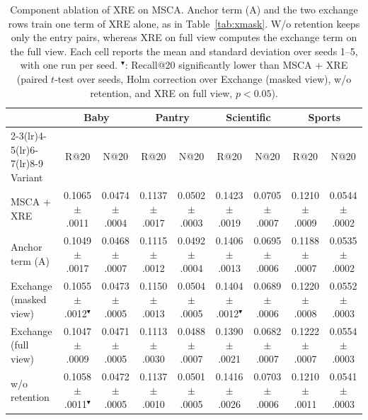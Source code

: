 \begin{table}[!t]
\caption{Component ablation of XRE on MSCA. Anchor term (A) and the two exchange rows train one term of XRE alone, as in Table~\ref{tab:xmask}. W/o retention keeps only the entry pairs, whereas XRE on full view computes the exchange term on the full view. Each cell reports the mean and standard deviation over seeds 1--5, with one run per seed. $^{\blacktriangledown}$: Recall@20 significantly lower than MSCA + XRE (paired $t$-test over seeds, Holm correction over Exchange (masked view), w/o retention, and XRE on full view, $p<0.05$).}
\label{tab:ablation_full}
\centering
\scriptsize
\setlength{\tabcolsep}{2pt}
\begin{tabular}{lcccccccc}
\toprule
 & \multicolumn{2}{c}{Baby} & \multicolumn{2}{c}{Pantry} & \multicolumn{2}{c}{Scientific} & \multicolumn{2}{c}{Sports} \\
\cmidrule(lr){2-3}\cmidrule(lr){4-5}\cmidrule(lr){6-7}\cmidrule(lr){8-9}
Variant & R@20 & N@20 & R@20 & N@20 & R@20 & N@20 & R@20 & N@20 \\
\midrule
MSCA + XRE & 0.1065{\tiny$\pm$.0011} & 0.0474{\tiny$\pm$.0004} & 0.1137{\tiny$\pm$.0017} & 0.0502{\tiny$\pm$.0003} & 0.1423{\tiny$\pm$.0019} & 0.0705{\tiny$\pm$.0007} & 0.1210{\tiny$\pm$.0009} & 0.0544{\tiny$\pm$.0002} \\
Anchor term (A) & 0.1049{\tiny$\pm$.0017} & 0.0468{\tiny$\pm$.0007} & 0.1115{\tiny$\pm$.0012} & 0.0492{\tiny$\pm$.0004} & 0.1406{\tiny$\pm$.0013} & 0.0695{\tiny$\pm$.0006} & 0.1188{\tiny$\pm$.0007} & 0.0535{\tiny$\pm$.0002} \\
Exchange (masked view) & 0.1055{\tiny$\pm$.0012}$^{\blacktriangledown}$ & 0.0473{\tiny$\pm$.0005} & 0.1150{\tiny$\pm$.0013} & 0.0504{\tiny$\pm$.0005} & 0.1404{\tiny$\pm$.0012}$^{\blacktriangledown}$ & 0.0689{\tiny$\pm$.0006} & 0.1220{\tiny$\pm$.0008} & 0.0552{\tiny$\pm$.0003} \\
Exchange (full view) & 0.1047{\tiny$\pm$.0009} & 0.0471{\tiny$\pm$.0005} & 0.1113{\tiny$\pm$.0030} & 0.0488{\tiny$\pm$.0007} & 0.1390{\tiny$\pm$.0021} & 0.0682{\tiny$\pm$.0007} & 0.1222{\tiny$\pm$.0007} & 0.0554{\tiny$\pm$.0003} \\
w/o retention & 0.1058{\tiny$\pm$.0011}$^{\blacktriangledown}$ & 0.0472{\tiny$\pm$.0005} & 0.1137{\tiny$\pm$.0010} & 0.0501{\tiny$\pm$.0005} & 0.1416{\tiny$\pm$.0026} & 0.0703{\tiny$\pm$.0006} & 0.1210{\tiny$\pm$.0011} & 0.0541{\tiny$\pm$.0003} \\

\end{tabular}
\end{table}
